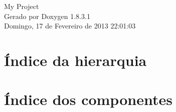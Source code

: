 \documentclass{book}
\begin{document}
\hypersetup{pageanchor=false,citecolor=blue}
\begin{titlepage}
\vspace*{7cm}
\begin{center}
{\Large My Project }\\
\vspace*{1cm}
{\large Gerado por Doxygen 1.8.3.1}\\
\vspace*{0.5cm}
{\small Domingo, 17 de Fevereiro de 2013 22:01:03}\\
\end{center}
\end{titlepage}
\clearemptydoublepage
{}
\tableofcontents
\clearemptydoublepage
{}
\hypersetup{pageanchor=true,citecolor=blue}
\chapter{Índice da hierarquia}

\chapter{Índice dos componentes}

\end{document}
